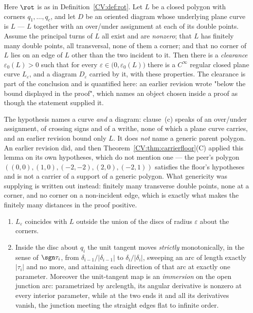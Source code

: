\begin{lemma}[rounding]\label{CV:lem:rounding}\leanok
Here $\rot$ is as in Definition~\ref{CV:def:rot}.
Let $L$ be a closed polygon with corners $q_1,\dots,q_c$, and let $D$ be an
oriented diagram whose underlying plane curve is $L$ --- $L$ together with an
over/under assignment at each of its double points. Assume the principal turns
of $L$ all exist and are \emph{nonzero}; that $L$ has finitely many double
points, all transversal, none of them a corner; and that no corner of $L$ lies
on an edge of $L$ other than the two incident to it. Then there is a \emph{clearance} $\varepsilon_0(L)>0$ such that for every
$\varepsilon\in\bigl(0,\varepsilon_0(L)\bigr)$ there is a $C^\infty$ regular
closed plane curve $L_\varepsilon$, and a diagram $D_\varepsilon$ carried by it, with
these properties. The clearance is part of the conclusion and is quantified
here: an earlier revision wrote "below the bound displayed in the proof", which
names an object chosen inside a proof as though the statement supplied it.

The hypothesis names a curve \emph{and} a diagram: clause~(c) speaks of an
over/under assignment, of crossing signs and of a writhe, none of which a plane
curve carries, and an earlier revision bound only $L$. It does \emph{not} name a
generic parent polygon. An earlier revision did, and then
Theorem~\ref{CV:thm:carrierfloor}(C) applied this lemma on its own hypotheses, which
do not mention one --- the peer's polygon $((0,0),(1,0),(-2,-2),(2,0),(-2,1))$
satisfies the floor's hypotheses and is not a carrier of a support of a generic
polygon. What genericity was supplying is written out instead: finitely many
transverse double points, none at a corner, and no corner on a non-incident
edge, which is exactly what makes the finitely many distances in the proof
positive.
\begin{enumerate}
\item[(a)] $L_\varepsilon$ coincides with $L$ outside the union of the discs of
radius $\varepsilon$ about the corners.
\item[(b)] Inside the disc about $q_i$ the unit tangent moves \emph{strictly}
monotonically, in the sense of $\sgn\tau_i$, from $\delta_{i-1}/|\delta_{i-1}|$
to $\delta_i/|\delta_i|$, sweeping an arc of length exactly $|\tau_i|$ and no
more, and attaining each direction of that arc at exactly one parameter.
Moreover the unit-tangent map is an \emph{immersion} on the open junction arc:
parametrized by arclength, its angular derivative is nonzero at every interior
parameter, while at the two ends it and all its derivatives vanish, the
junction meeting the straight edges flat to infinite order.


\end{enumerate}
\end{lemma}
